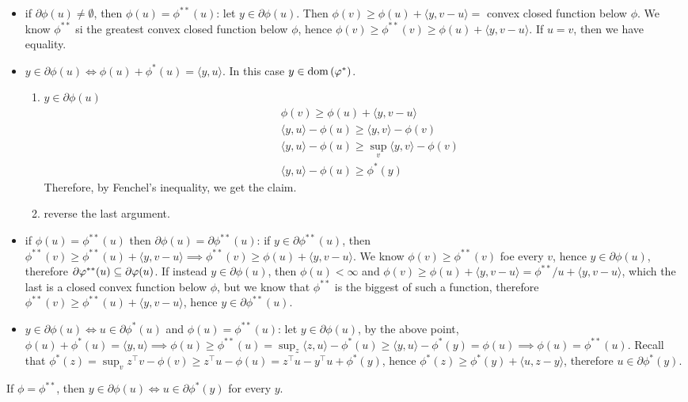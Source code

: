 \begin{itemize}
    \item if $\partial\phi(u) \neq \emptyset$, then $\phi(u) = \phi^{**}(u)$: let $y \in \partial\phi(u)$. Then $\phi(v) \ge \phi(u) + \langle y, v-u\rangle =$ convex closed function below $\phi$. We know $\phi^{**}$ si the greatest convex closed function below $\phi$, hence $\phi(v) \ge \phi^{**}(v) \ge \phi(u) + \langle y, v-u \rangle$. If $u = v$, then we have equality.
    \item $y \in \partial\phi(u) \iff \phi(u) + \phi^*(u) = \langle y,u \rangle$. In this case $y \in \mathrm{dom}\left(\varphi^*\right)$.
    \begin{enumerate}
        \item[''$\implies$''] $y \in \partial\phi(u)$
            \begin{align*}
                &\phi(v) \ge \phi(u) + \langle y, v-u\rangle \\
                & \langle y,u\rangle -\phi(u) \ge \langle y,v\rangle - \phi(v) \\
                &\langle y,u\rangle - \phi(u) \ge \sup_v \langle y,v \rangle -\phi(v) \\
                &\langle y,u\rangle - \phi(u) \ge \phi^*(y)
            \end{align*}
        Therefore, by Fenchel's inequality, we get the claim.
        \item[''$\impliedby$''] reverse the last argument.
    \end{enumerate}
    \item if $\phi(u) = \phi^{**}(u)$ then $\partial\phi(u) = \partial\phi^{**}(u)$: if $y \in \partial\phi^{**}(u)$, then $\phi^{**}(v) \ge \phi^{**}(u) + \langle y, v-u\rangle \implies \phi^{**}(v) \ge \phi(u) +\langle y, v-u\rangle$. We know $\phi(v) \ge \phi^{**}(v)$ foe every $v$, hence $y \in \partial\phi(u)$, therefore $\partial\varphi^{**}(u) \subseteq \partial\varphi(u)$. If instead $y \in \partial\phi(u)$, then $\phi(u) < \infty$ and $\phi(v) \ge \phi(u) + \langle y, v-u\rangle = \phi^{**}/u
    + \langle y, v-u\rangle$, which the last is a closed convex function below $\phi$, but we know that $\phi^{**}$ is the biggest of such a function, therefore $\phi^{**}(v) \ge \phi^{**}(u) + \langle y, v-u\rangle$, hence $y \in \partial \phi^{**}(u)$.
    \item $y \in \partial\phi(u) \iff u \in \partial\phi^*(u)$ and $\phi(u) = \phi^{**}(u)$: let $y \in \partial\phi(u)$, by the above point, $\phi(u) + \phi^*(u) = \langle y,u\rangle \implies \phi(u) \ge \phi^{**}(u) = \sup_z \langle z,u \rangle - \phi^*(u) \ge \langle y,u \rangle - \phi^*(y) = \phi(u) \implies \phi(u) = \phi^{**}(u)$. Recall that $\phi^*(z) = \sup_v z^\top v - \phi(v) \ge z^\top u -\phi(u) = z^\top u - y^\top u + \phi^*(y)$, hence $\phi^*(z) \ge \phi^*(y) + \langle u, z-y \rangle$, therefore $u \in\partial\phi^*(y)$.
\end{itemize}

\begin{corollary}
    
    If $\phi = \phi^{**}$, then $y \in \partial\phi(u) \iff u \in \partial\phi^*(y)$ for every $y$.

\end{corollary}

